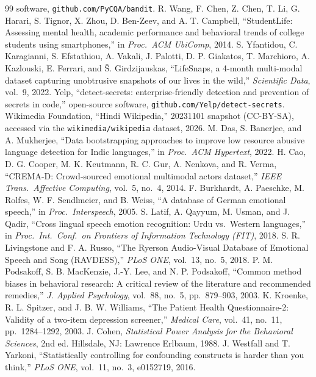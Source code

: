 \documentclass[11pt,a4paper]{article}
\begin{document}
\begin{thebibliography}{99}
software, \texttt{github.com/PyCQA/bandit}.
 R. Wang, F. Chen, Z. Chen, T. Li, G. Harari, S. Tignor,
X. Zhou, D. Ben-Zeev, and A. T. Campbell, ``StudentLife: Assessing mental health,
academic performance and behavioral trends of college students using smartphones,''
in \emph{Proc.\ ACM UbiComp}, 2014.
 S. Yfantidou, C. Karagianni, S. Efstathiou, A. Vakali,
J. Palotti, D. P. Giakatos, T. Marchioro, A. Kazlouski, E. Ferrari, and
\v{S}. Girdzijauskas, ``LifeSnaps, a 4-month multi-modal dataset capturing
unobtrusive snapshots of our lives in the wild,'' \emph{Scientific Data}, vol.~9,
2022.
 Yelp, ``detect-secrets: enterprise-friendly detection and
prevention of secrets in code,'' open-source software,
\texttt{github.com/Yelp/detect-secrets}.
 Wikimedia Foundation, ``Hindi Wikipedia,'' 20231101 snapshot
(CC-BY-SA), accessed via the \texttt{wikimedia/wikipedia} dataset, 2026.
 M. Das, S. Banerjee, and A. Mukherjee, ``Data bootstrapping
approaches to improve low resource abusive language detection for Indic
languages,'' in \emph{Proc.\ ACM Hypertext}, 2022.
 H. Cao, D. G. Cooper, M. K. Keutmann, R. C. Gur, A. Nenkova, and
R. Verma, ``CREMA-D: Crowd-sourced emotional multimodal actors dataset,'' \emph{IEEE
Trans.\ Affective Computing}, vol.~5, no.~4, 2014.
 F. Burkhardt, A. Paeschke, M. Rolfes, W. F. Sendlmeier, and B. Weiss,
``A database of German emotional speech,'' in \emph{Proc.\ Interspeech}, 2005.
 S. Latif, A. Qayyum, M. Usman, and J. Qadir, ``Cross lingual speech
emotion recognition: Urdu vs.\ Western languages,'' in \emph{Proc.\ Int.\ Conf.\ on
Frontiers of Information Technology (FIT)}, 2018.
 S. R. Livingstone and F. A. Russo, ``The Ryerson Audio-Visual
Database of Emotional Speech and Song (RAVDESS),'' \emph{PLoS ONE}, vol.\ 13, no.\ 5,
2018.
 P. M. Podsakoff, S. B. MacKenzie, J.-Y. Lee, and N. P. Podsakoff,
``Common method biases in behavioral research: A critical review of the literature and
recommended remedies,'' \emph{J. Applied Psychology}, vol.~88, no.~5, pp.~879--903, 2003.
 K. Kroenke, R. L. Spitzer, and J. B. W. Williams, ``The Patient Health
Questionnaire-2: Validity of a two-item depression screener,'' \emph{Medical Care},
vol.~41, no.~11, pp.~1284--1292, 2003.
 J. Cohen, \emph{Statistical Power Analysis for the Behavioral Sciences},
2nd ed. Hillsdale, NJ: Lawrence Erlbaum, 1988.
 J. Westfall and T. Yarkoni, ``Statistically controlling for
confounding constructs is harder than you think,'' \emph{PLoS ONE}, vol.~11, no.~3,
e0152719, 2016.
\end{thebibliography}
\end{document}

